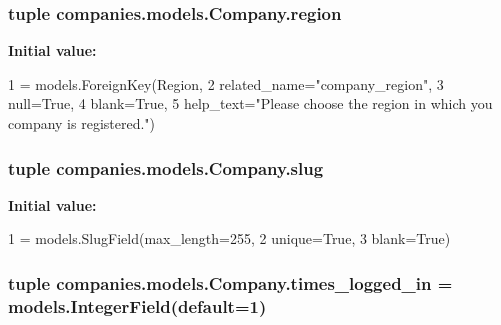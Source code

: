 \hypertarget{classcompanies_1_1models_1_1_company_a338cbaa77e0e881edde3c21620e80354}{
\subsubsection[{region}]{\setlength{\rightskip}{0pt plus 5cm}tuple companies.\-models.\-Company.\-region\hspace{0.3cm}{\ttfamily [static]}}}\label{classcompanies_1_1models_1_1_company_a338cbaa77e0e881edde3c21620e80354}
{\bfseries Initial value\-:}
\begin{DoxyCode}
1 = models.ForeignKey(Region,
2                                related\_name=\textcolor{stringliteral}{"company\_region"},
3                                null=\textcolor{keyword}{True},
4                                blank=\textcolor{keyword}{True},
5                                help\_text=\textcolor{stringliteral}{"Please choose the region in which you company is registered."})
\end{DoxyCode}
\hypertarget{classcompanies_1_1models_1_1_company_a03bc52deb463d3a7072deabf847daa60}{
\subsubsection[{slug}]{\setlength{\rightskip}{0pt plus 5cm}tuple companies.\-models.\-Company.\-slug\hspace{0.3cm}{\ttfamily [static]}}}\label{classcompanies_1_1models_1_1_company_a03bc52deb463d3a7072deabf847daa60}
{\bfseries Initial value\-:}
\begin{DoxyCode}
1 = models.SlugField(max\_length=255,
2                             unique=\textcolor{keyword}{True},
3                             blank=\textcolor{keyword}{True})
\end{DoxyCode}
\hypertarget{classcompanies_1_1models_1_1_company_a437fd559e316465cde21902f42d08bea}{
\subsubsection[{times\-\_\-logged\-\_\-in}]{\setlength{\rightskip}{0pt plus 5cm}tuple companies.\-models.\-Company.\-times\-\_\-logged\-\_\-in = models.\-Integer\-Field(default=1)\hspace{0.3cm}{\ttfamily [static]}}}\label{classcompanies_1_1models_1_1_company_a437fd559e316465cde21902f42d08bea}
